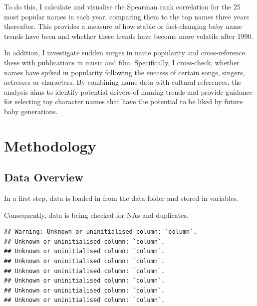 \documentclass[11pt,preprint]{elsarticle}
\numberwithin{equation}{section}
\numberwithin{figure}{section}
\numberwithin{table}{section}
\begin{document}
To do this, I calculate and visualise the Spearman rank correlation for
the 25 most popular names in each year, comparing them to the top names
three years thereafter. This provides a measure of how stable or
fast-changing baby name trends have been and whether these trends have
become more volatile after 1990.

In addition, I investigate sudden surges in name popularity and
cross-reference these with publications in music and film. Specifically,
I cross-check, whether names have spiked in popularity following the
success of certain songs, singers, actresses or characters. By combining
name data with cultural references, the analysis aims to identify
potential drivers of naming trends and provide guidance for selecting
toy character names that have the potential to be liked by future baby
generations.

\section{Methodology}\label{methodology}

\subsection{Data Overview}\label{data-overview}

In a first step, data is loaded in from the data folder and stored in
variables.

\begin{Shaded}
\begin{Highlighting}[]
\OtherTok{\textless{}{-}} \NormalTok{(}\NormalTok{)}
\OtherTok{\textless{}{-}} \NormalTok{(}\NormalTok{)}
\OtherTok{\textless{}{-}} \NormalTok{(}\NormalTok{)}
\OtherTok{\textless{}{-}} \NormalTok{(}\NormalTok{)}
\end{Highlighting}
\end{Shaded}

Consequently, data is being checked for NAs and duplicates.

\begin{verbatim}
## Warning: Unknown or uninitialised column: `column`.
## Unknown or uninitialised column: `column`.
## Unknown or uninitialised column: `column`.
## Unknown or uninitialised column: `column`.
## Unknown or uninitialised column: `column`.
## Unknown or uninitialised column: `column`.
## Unknown or uninitialised column: `column`.
## Unknown or uninitialised column: `column`.
\end{verbatim}
\end{document}
